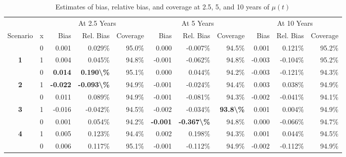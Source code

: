 \begin{table}

\caption{Estimates of bias, relative bias, and coverage at 2.5, 5, and 10 years of $\mu(t)$}
\centering
\begin{tabular}[t]{>{}ccrrrrrrrrr}
\toprule
\multicolumn{2}{c}{ } & \multicolumn{3}{c}{At 2.5 Years} & \multicolumn{3}{c}{At 5 Years} & \multicolumn{3}{c}{At 10 Years} \\
\cmidrule(l{3pt}r{3pt}){3-5} \cmidrule(l{3pt}r{3pt}){6-8} \cmidrule(l{3pt}r{3pt}){9-11}
Scenario & x & Bias & Rel. Bias & Coverage & Bias & Rel. Bias & Coverage & Bias & Rel. Bias & Coverage\\
\midrule
 & 0 & 0.001 & 0.029\% & 95.0\% & 0.000 & -0.007\% & 94.5\% & 0.001 & 0.121\% & 95.2\%\\

\multirow[t]{-2}{*}{\centering\arraybackslash \textbf{1}} & 1 & 0.004 & 0.045\% & 94.8\% & -0.001 & -0.062\% & 94.8\% & -0.003 & -0.104\% & 95.2\%\\

 & 0 & \textbf{ 0.014} & \textbf{ 0.190\textbackslash{}\%} & 95.1\% & 0.000 & 0.044\% & 94.2\% & -0.003 & -0.121\% & 94.3\%\\

\multirow[t]{-2}{*}{\centering\arraybackslash \textbf{2}} & 1 & \textbf{-0.022} & \textbf{-0.093\textbackslash{}\%} & 94.9\% & -0.001 & -0.024\% & 94.4\% & 0.003 & 0.038\% & 94.9\%\\

 & 0 & 0.011 & 0.089\% & 94.9\% & -0.001 & -0.081\% & 94.3\% & -0.002 & -0.041\% & 94.1\%\\

\multirow[t]{-2}{*}{\centering\arraybackslash \textbf{3}} & 1 & -0.016 & -0.042\% & 94.5\% & -0.002 & -0.034\% & \textbf{93.8\textbackslash{}\%} & 0.001 & 0.004\% & 94.9\%\\

\rule{0pt}{4ex}
 & 0 & 0.001 & 0.054\% & 94.2\% & \textbf{-0.001} & \textbf{-0.367\textbackslash{}\%} & 94.8\% & 0.000 & -0.066\% & 94.7\%\\

\multirow[t]{-2}{*}{\centering\arraybackslash \textbf{4}} & 1 & 0.005 & 0.123\% & 94.4\% & 0.002 & 0.198\% & 94.3\% & 0.001 & 0.044\% & 94.5\%\\

 & 0 & 0.006 & 0.117\% & 95.1\% & -0.001 & -0.112\% & 94.9\% & -0.002 & -0.112\% & 94.9\%\\


\end{tabular}
\end{table}
